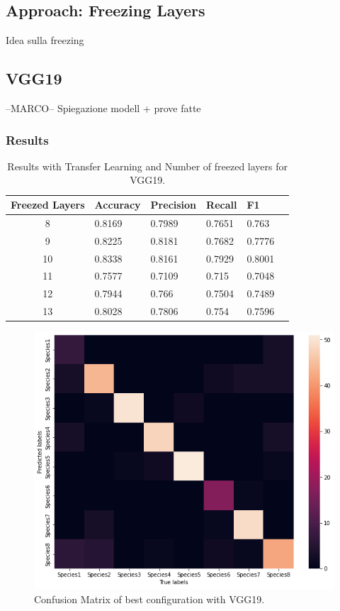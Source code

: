 \documentclass[10pt]{article}
\begin{document}
\subsection{Approach: Freezing Layers}
Idea sulla freezing
\subsection{VGG19}

--MARCO--
Spiegazione modell + prove fatte
\subsubsection{Results}


\begin{table}[ht]
\centering
\begin{adjustbox}{width=240}
\small
\begin{tabular}{|c|l|l|l|l|l}

\hline \bf Freezed Layers & \bf Accuracy & \bf Precision & \bf Recall & \bf F1 \\ \hline
8 & 0.8169 & 0.7989 & 0.7651 & 0.763\\
9 & 0.8225 & 0.8181 & 0.7682 & 0.7776\\
10 & 0.8338 & 0.8161 & 0.7929 & 0.8001\\
11 & 0.7577 & 0.7109 & 0.715 & 0.7048\\
12 & 0.7944 & 0.766 & 0.7504 & 0.7489\\
13 & 0.8028 & 0.7806 & 0.754 & 0.7596\\
\hline
\end{tabular}
\end{adjustbox}
\caption{Results with Transfer Learning and Number of freezed layers for VGG19.}
\end{table}


\begin{figure}[ht]
\begin{center}
\centerline{\includegraphics[width=\columnwidth]{VGG19_best}}
\caption{Confusion Matrix of best configuration with VGG19.}
\label{bayespic}
\end{center}
\end{figure}
\end{document}
